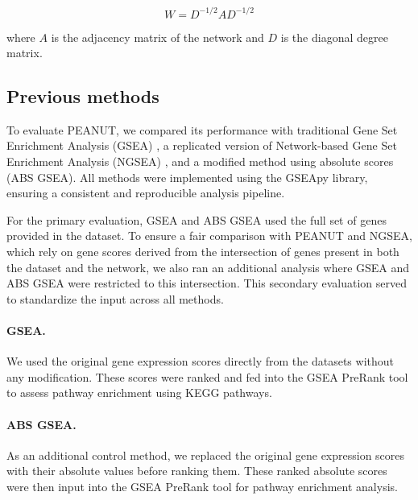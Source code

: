 \documentclass{article}
\begin{document}
\[
W = D^{-1/2} A D^{-1/2}
\]

where \(A\) is the adjacency matrix of the network and \(D\) is the diagonal degree matrix. 

\subsection{Previous methods}
To evaluate PEANUT, we compared its performance with traditional Gene Set Enrichment Analysis (GSEA) \cite{Subramanian2005}, a replicated version of Network-based Gene Set Enrichment Analysis (NGSEA) \cite{Han2019}, and a modified method using absolute scores (ABS GSEA). All methods were implemented using the GSEApy library, ensuring a consistent and reproducible analysis pipeline.

For the primary evaluation, GSEA and ABS GSEA used the full set of genes provided in the dataset. To ensure a fair comparison with PEANUT and NGSEA, which rely on gene scores derived from the intersection of genes present in both the dataset and the network, we also ran an additional analysis where GSEA and ABS GSEA were restricted to this intersection. This secondary evaluation served to standardize the input across all methods.

\paragraph{GSEA.}
We used the original gene expression scores directly from the datasets without any modification. These scores were ranked and fed into the GSEA PreRank tool to assess pathway enrichment using KEGG pathways.

\paragraph{ABS GSEA.}
As an additional control method, we replaced the original gene expression scores with their absolute values before ranking them. These ranked absolute scores were then input into the GSEA PreRank tool for pathway enrichment analysis. 

\end{document}
